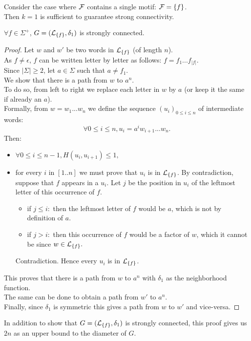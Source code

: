 \documentclass{article}
\begin{document}
Consider the case where $\mathcal{F}$ contains a single motif: $\mathcal{F} = \{f\}$. \\
Then $k = 1$ is sufficient to guarantee strong connectivity.
\begin{result}
	$\forall f \in \Sigma^+$, $G = (\mathcal{L}_{\{f\}}, \delta_1)$ is strongly connected.
\end{result}
\begin{proof}
	Let $w$ and $w'$ be two words in $\mathcal{L}_{\{f\}}$ (of length $n$). \\
	As $f \neq \epsilon$, $f$ can be written letter by letter as follows: $f = f_1 ... f_{|f|}$. \\
	Since $|\Sigma| \geq 2$, let $a \in \Sigma$ such that $a \neq f_1$. \\
	We show that there is a path from $w$ to $a^n$. \\
	To do so, from left to right we replace each letter in $w$ by $a$ (or keep it the same if already an $a$). \\
	Formally, from $w = w_1 ... w_n$ we define the sequence $(u_i)_{0 \leq i \leq n}$ of intermediate words:
	$$ \forall 0 \leq i \leq n, u_i = a^i w_{i+1} ... w_n.$$
	Then:
	\begin{itemize}
		\item $\forall 0 \leq i \leq n - 1, H(u_i, u_{i+1}) \leq 1,$
		\item for every $i$ in $[1..n]$ we must prove that $u_i$ is in $\mathcal{L}_{\{f\}}$. By contradiction, suppose that $f$ appears in a $u_i$. Let $j$ be the position in $u_i$ of the leftmost letter of this occurrence of $f$.
		\begin{itemize}
			\item if $j \leq i:$ then the leftmost letter of $f$ would be $a$, which is not by definition of $a$.
			\item if $j > i:$ then this occurrence of $f$ would be a factor of $w$, which it cannot be since $w \in \mathcal{L}_{\{f\}}.$
		\end{itemize}
	Contradiction. Hence every $u_i$ is in $\mathcal{L}_{\{f\}}$.
	\end{itemize}
	This proves that there is a path from $w$ to $a^n$ with $\delta_1$ as the neighborhood function. \\
	The same can be done to obtain a path from $w'$ to $a^n$. \\
	Finally, since $\delta_1$ is symmetric this gives a path from $w$ to $w'$ and vice-versa.	
\end{proof}

In addition to show that $G = (\mathcal{L}_{\{f\}}, \delta_1)$ is strongly connected, this proof gives us $2n$ as an upper bound to the diameter of $G$.
\end{document}
